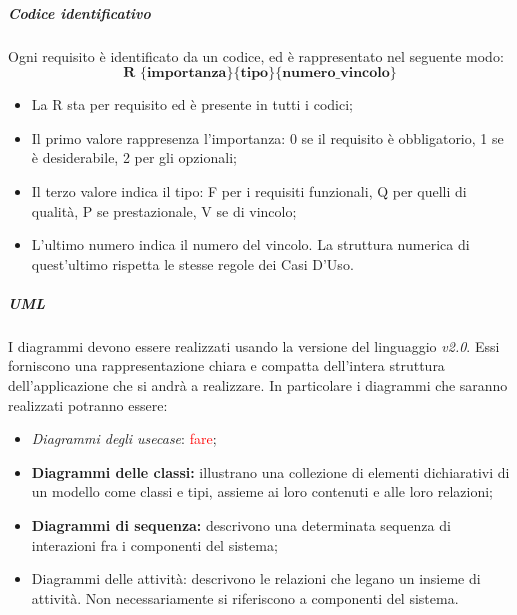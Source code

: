 			
			\subparagraph{Codice identificativo} \Spazio
			Ogni requisito è identificato da un codice, ed è rappresentato nel seguente modo:
			$$ \textbf{R \{importanza\}\{tipo\}\{numero\_vincolo\} } $$
			
			\begin{itemize}
				\item La R sta per requisito ed è presente in tutti i codici;
				\item Il primo valore rappresenza l'importanza: 0 se il requisito è obbligatorio, 1 se è desiderabile, 2 per gli opzionali;
				\item Il terzo valore indica il tipo: F per i requisiti funzionali, Q per quelli di qualità, P se prestazionale, V se di vincolo;
				\item L'ultimo numero indica il numero del vincolo. La struttura numerica di quest'ultimo rispetta le stesse regole dei Casi D'Uso.
			\end{itemize}
		
	        
		    
			\subparagraph{UML}
			\label{sec:UML} \Spazio
			I diagrammi  devono essere realizzati usando la versione del linguaggio \textit{v2.0}. Essi forniscono una rappresentazione chiara e compatta dell'intera struttura dell'applicazione che si andrà a realizzare. In particolare i diagrammi che saranno realizzati potranno essere:
			\begin{itemize}
				\item \emph{Diagrammi degli usecase}: \textcolor{red}{fare};
				\item \textbf{Diagrammi delle classi:} illustrano una collezione di elementi dichiarativi di un modello come classi e tipi, assieme ai loro contenuti e alle loro relazioni;
				\item \textbf{Diagrammi di sequenza:} descrivono una determinata sequenza di interazioni fra i componenti del sistema;
				\item{Diagrammi delle attività:} descrivono le relazioni che legano un insieme di attività. Non necessariamente si riferiscono a componenti del sistema.
			\end{itemize}
			
			
